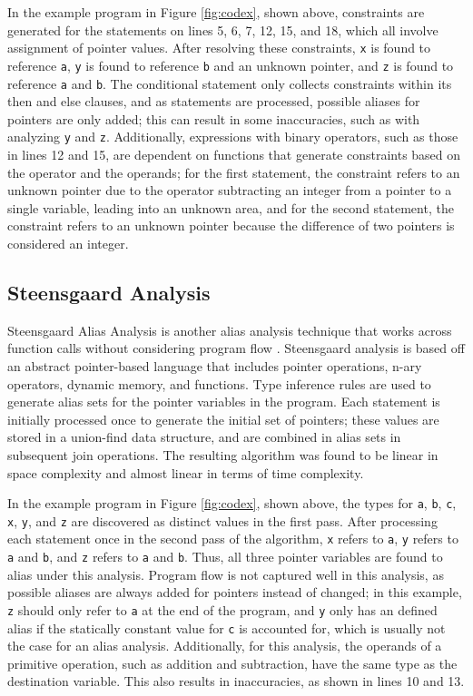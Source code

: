 In the example program in Figure \ref{fig:codex}, shown above, constraints are generated for the statements on lines 5, 6, 7, 12, 15, and 18, which all involve assignment of pointer values. After resolving these constraints, \texttt{x} is found to reference \texttt{a}, \texttt{y} is found to reference \texttt{b} and an unknown pointer, and \texttt{z} is found to reference \texttt{a} and \texttt{b}. The conditional statement only collects constraints within its then and else clauses, and as statements are processed, possible aliases for pointers are only added; this can result in some inaccuracies, such as with analyzing \texttt{y} and \texttt{z}. Additionally, expressions with binary operators, such as those in lines 12 and 15, are dependent on functions that generate constraints based on the operator and the operands; for the first statement, the constraint refers to an unknown pointer due to the operator subtracting an integer from a pointer to a single variable, leading into an unknown area, and for the second statement, the constraint refers to an unknown pointer because the difference of two pointers is considered an integer.

\subsection{Steensgaard Analysis}
Steensgaard Alias Analysis is another alias analysis technique that works across function calls without considering program flow \cite{Steensgaard}. Steensgaard analysis is based off an abstract pointer-based language that includes pointer operations, n-ary operators, dynamic memory, and functions. Type inference rules are used to generate alias sets for the pointer variables in the program. Each statement is initially processed once to generate the initial set of pointers; these values are stored in a union-find data structure, and are combined in alias sets in subsequent join operations. The resulting algorithm was found to be linear in space complexity and almost linear in terms of time complexity.

In the example program in Figure \ref{fig:codex}, shown above, the types for \texttt{a}, \texttt{b}, \texttt{c}, \texttt{x}, \texttt{y}, and \texttt{z} are discovered as distinct values in the first pass. After processing each statement once in the second pass of the algorithm, \texttt{x} refers to \texttt{a}, \texttt{y} refers to \texttt{a} and \texttt{b}, and \texttt{z} refers to \texttt{a} and \texttt{b}. Thus, all three pointer variables are found to alias under this analysis. Program flow is not captured well in this analysis, as possible aliases are always added for pointers instead of changed; in this example, \texttt{z} should only refer to \texttt{a} at the end of the program, and \texttt{y} only has an defined alias if the statically constant value for \texttt{c} is accounted for, which is usually not the case for an alias analysis. Additionally, for this analysis, the operands of a primitive operation, such as addition and subtraction, have the same type as the destination variable. This also results in inaccuracies, as shown in lines 10 and 13.

